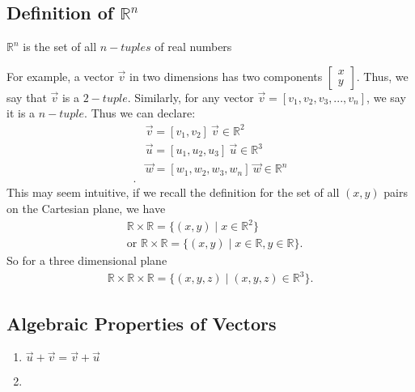\documentclass{report}
\begin{document}
    \subsection{Definition of $\mathbb{R}^{n}$}
    \bigbreak \noindent 
    \begin{definition}
       $\mathbb{R}^{n}$ is the set of all $n-tuples$ of real numbers  
    \end{definition}
    \bigbreak \noindent 
    For example, a vector $\vec{v}$ in two dimensions has two components $\begin{bmatrix} x \\ y\end{bmatrix}$. Thus, we say that $\vec{v}$ is a $2-tuple$. Similarly, for any vector $\vec{v} = [v_{1}, v_{2}, v_{3},...,v_{n}]$, we say it is a $n-tuple$. Thus we can declare:
    \begin{align*}
        &\vec{v} = [v_{1}, v_{2}]\ \vec{v} \in \mathbb{R}^{2} \\
        &\vec{u} = [u_{1}, u_{2},u_{3}]\ \vec{u} \in \mathbb{R}^{3} \\
        &\vec{w} = [w_{1}, w_{2},w_{3}, w_{n}]\ \vec{w} \in \mathbb{R}^{n} \\
    .\end{align*}
    \bigbreak \noindent 
    This may seem intuitive, if we recall the definition for the set of all $(x,y)$ pairs on the Cartesian plane, we have
    \begin{align*}
        &\mathbb{R} \times \mathbb{R} = \{(x,y) \mid x \in \mathbb{R}^{2}\} \\
        &\text{or }\mathbb{R} \times \mathbb{R} = \{(x,y) \mid x \in \mathbb{R}, y \in \mathbb{R}\}
    .\end{align*}
    \bigbreak \noindent 
    So for a three dimensional plane
    \begin{align*}
        \mathbb{R} \times \mathbb{R} \times \mathbb{R} = \{(x,y,z) \mid (x,y,z) \in \mathbb{R}^{3}\}
    .\end{align*}

    \pagebreak \bigbreak \noindent 
    \subsection{Algebraic Properties of Vectors }
    \bigbreak \noindent 
    \begin{enumerate}[label=(\roman*)]
        \item $\vec{u}  + \vec{v}  = \vec{v} + \vec{u}$ 
        \item 
    \end{enumerate}
    

    
    
\end{document}
